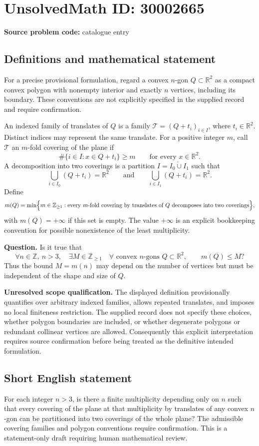 \documentclass[11pt]{article}
\newcommand{\Z}{\mathbb{Z}}
\newcommand{\R}{\mathbb{R}}
\begin{document}
\section*{UnsolvedMath ID: 30002665}
\textbf{Source problem code:} catalogue entry
\subsection{Definitions and mathematical statement}
For a precise provisional formulation, regard a convex \(n\)-gon \(Q\subset\R^2\) as a compact convex polygon with nonempty interior and exactly \(n\) vertices, including its boundary. These conventions are not explicitly specified in the supplied record and require confirmation.

An indexed family of translates of \(Q\) is a family \(\mathcal T=(Q+t_i)_{i\in I}\), where \(t_i\in\R^2\). Distinct indices may represent the same translate. For a positive integer \(m\), call \(\mathcal T\) an \(m\)-fold covering of the plane if
\[
\#\{i\in I:x\in Q+t_i\}\ge m
\qquad\text{for every }x\in\R^2.
\]
A decomposition into two coverings is a partition \(I=I_0\mathbin{\dot\cup}I_1\) such that
\[
\bigcup_{i\in I_0}(Q+t_i)=\R^2
\qquad\text{and}\qquad
\bigcup_{i\in I_1}(Q+t_i)=\R^2.
\]
Define
\[
m(Q)=\min\Bigl\{m\in\Z_{\ge1}:\text{every }m\text{-fold covering by translates of }Q
\text{ decomposes into two coverings}\Bigr\},
\]
with \(m(Q)=+\infty\) if this set is empty. The value \(+\infty\) is an explicit bookkeeping convention for possible nonexistence of the least multiplicity.

\textbf{Question.} Is it true that
\[
\forall n\in\Z,\ n>3,\quad
\exists M\in\Z_{\ge1}\quad
\forall\text{ convex }n\text{-gons }Q\subset\R^2,
\qquad m(Q)\le M?
\]
Thus the bound \(M=m(n)\) may depend on the number of vertices but must be independent of the shape and size of \(Q\).

\textbf{Unresolved scope qualification.} The displayed definition provisionally quantifies over arbitrary indexed families, allows repeated translates, and imposes no local finiteness restriction. The supplied record does not specify these choices, whether polygon boundaries are included, or whether degenerate polygons or redundant collinear vertices are allowed. Consequently this explicit interpretation requires source confirmation before being treated as the definitive intended formulation.
\subsection{Short English statement}
For each integer \(n>3\), is there a finite multiplicity depending only on \(n\) such that every covering of the plane at that multiplicity by translates of any convex \(n\)-gon can be partitioned into two coverings of the whole plane? The admissible covering families and polygon conventions require confirmation. This is a statement-only draft requiring human mathematical review.
\end{document}
